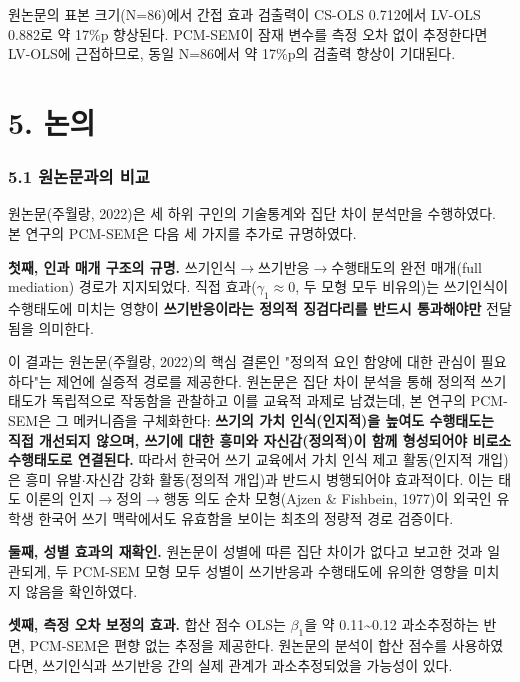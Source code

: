 \documentclass[a4paper,10pt]{oblivoir}
\begin{document}
원논문의 표본 크기(N=86)에서 간접 효과 검출력이 CS-OLS 0.712에서 LV-OLS 0.882로 약 17\%p 향상된다. PCM-SEM이 잠재 변수를 측정 오차 없이 추정한다면 LV-OLS에 근접하므로, 동일 N=86에서 약 17\%p의 검출력 향상이 기대된다.


\section{5. 논의}

\subsubsection{5.1 원논문과의 비교}

원논문(주월랑, 2022)은 세 하위 구인의 기술통계와 집단 차이 분석만을 수행하였다. 본 연구의 PCM-SEM은 다음 세 가지를 추가로 규명하였다.

\textbf{첫째, 인과 매개 구조의 규명.} 쓰기인식\ensuremath{\rightarrow}쓰기반응\ensuremath{\rightarrow}수행태도의 완전 매개(full mediation) 경로가 지지되었다. 직접 효과($\gamma_1 \approx 0$, 두 모형 모두 비유의)는 쓰기인식이 수행태도에 미치는 영향이 \textbf{쓰기반응이라는 정의적 징검다리를 반드시 통과해야만} 전달됨을 의미한다.

이 결과는 원논문(주월랑, 2022)의 핵심 결론인 "정의적 요인 함양에 대한 관심이 필요하다"는 제언에 실증적 경로를 제공한다. 원논문은 집단 차이 분석을 통해 정의적 쓰기 태도가 독립적으로 작동함을 관찰하고 이를 교육적 과제로 남겼는데, 본 연구의 PCM-SEM은 그 메커니즘을 구체화한다: \textbf{쓰기의 가치 인식(인지적)을 높여도 수행태도는 직접 개선되지 않으며, 쓰기에 대한 흥미와 자신감(정의적)이 함께 형성되어야 비로소 수행태도로 연결된다.} 따라서 한국어 쓰기 교육에서 가치 인식 제고 활동(인지적 개입)은 흥미 유발\ensuremath{\cdot}자신감 강화 활동(정의적 개입)과 반드시 병행되어야 효과적이다. 이는 태도 이론의 인지\ensuremath{\rightarrow}정의\ensuremath{\rightarrow}행동 의도 순차 모형(Ajzen \& Fishbein, 1977)이 외국인 유학생 한국어 쓰기 맥락에서도 유효함을 보이는 최초의 정량적 경로 검증이다.

\textbf{둘째, 성별 효과의 재확인.} 원논문이 성별에 따른 집단 차이가 없다고 보고한 것과 일관되게, 두 PCM-SEM 모형 모두 성별이 쓰기반응과 수행태도에 유의한 영향을 미치지 않음을 확인하였다.

\textbf{셋째, 측정 오차 보정의 효과.} 합산 점수 OLS는 $\beta_1$을 약 0.11\~{}0.12 과소추정하는 반면, PCM-SEM은 편향 없는 추정을 제공한다. 원논문의 분석이 합산 점수를 사용하였다면, 쓰기인식과 쓰기반응 간의 실제 관계가 과소추정되었을 가능성이 있다.
\end{document}
